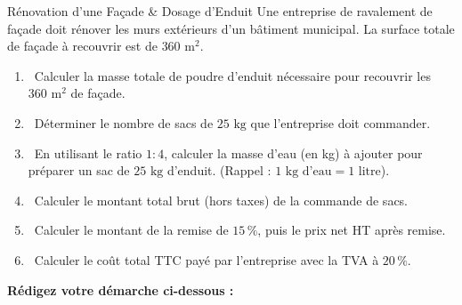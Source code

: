 \begin{sujetdnb}{Rénovation d'une Façade \& Dosage d'Enduit}
Une entreprise de ravalement de façade doit rénover les murs extérieurs d'un bâtiment municipal.
La surface totale de façade à recouvrir est de \textbf{$360\text{ m}^2$}.

\begin{center}
\end{center}

\begin{enumerate}
    \item \capRealiser\ Calculer la masse totale de poudre d'enduit nécessaire pour recouvrir les $360\text{ m}^2$ de façade.
    \item \capAnalyser\ Déterminer le nombre de sacs de $25\text{ kg}$ que l'entreprise doit commander.
    \item \capRealiser\ En utilisant le ratio $1 : 4$, calculer la masse d'eau (en kg) à ajouter pour préparer un sac de $25\text{ kg}$ d'enduit. (Rappel : $1\text{ kg d'eau} = 1\text{ litre}$).
    \item \capRealiser\ Calculer le montant total brut (hors taxes) de la commande de sacs.
    \item \capRealiser\ Calculer le montant de la remise de $15\,\%$, puis le prix net HT après remise.
    \item \capValider\ Calculer le coût total TTC payé par l'entreprise avec la TVA à $20\,\%$.
\end{enumerate}

\vspace{2mm}
\noindent\textbf{Rédigez votre démarche ci-dessous :}
\lignesreponse[8]
\end{sujetdnb}
